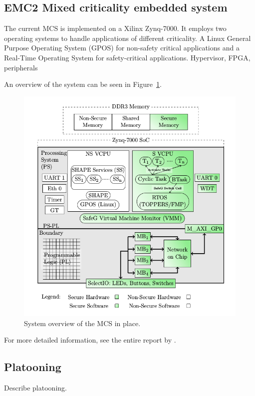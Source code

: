 \subsection{EMC2 Mixed criticality embedded system}
\label{sec:mces}
The current MCS is implemented on a Xilinx Zynq-7000. It employs two operating systems to handle applications of different criticality. A Linux General Purpose Operating System (GPOS) for non-safety critical applications and a Real-Time Operating System for safety-critical applications. Hypervisor, FPGA, peripherals

An overview of the system can be seen in Figure~\ref{fig:introduction_overview}.

\begin{figure}[H]
\centering
\includegraphics[width=\textwidth]{./img/introduction_overview.png}
\caption{System overview of the MCS in place.\cite{zaki2016}}\label{fig:introduction_overview}
\end{figure}

For more detailed information, see the entire report by \cite{zaki2016}.

\subsection{Platooning}
\label{sec:platooning}
Describe platooning.

